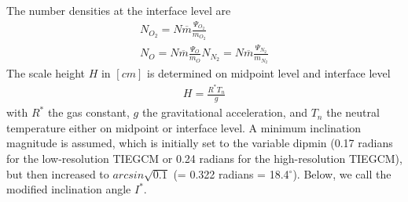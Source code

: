 %
The number densities at the interface level are
%
\begin{align}
   N_{O_2} = N \overline{m} \frac{\Psi_{O_2}}{m_{O_2}} \\
   N_{O} = N \overline{m} \frac{\Psi_{O}}{m_{O}}
   N_{N_2} = N \overline{m} \frac{\Psi_{N_2}}{m_{N_2}}
\end{align}
%
%
The scale height $H$ in $[cm]$ is determined on midpoint level and interface level
%
\begin{align}
  H = \frac{R^* T_n}{g}
\end{align}
%
with $R^*$ the gas constant, $g$ the gravitational acceleration,
and $T_n$ the neutral temperature either on midpoint or interface
level. A minimum inclination magnitude is assumed, which is initially
set to the variable dipmin (0.17 radians for the low-resolution TIEGCM
or 0.24 radians for the high-resolution TIEGCM), but then increased to 
$arcsin \sqrt{0.1}$ (= 0.322 radians = 18.4$^\circ$).
Below, we call the modified inclination angle $I^*$.
%

